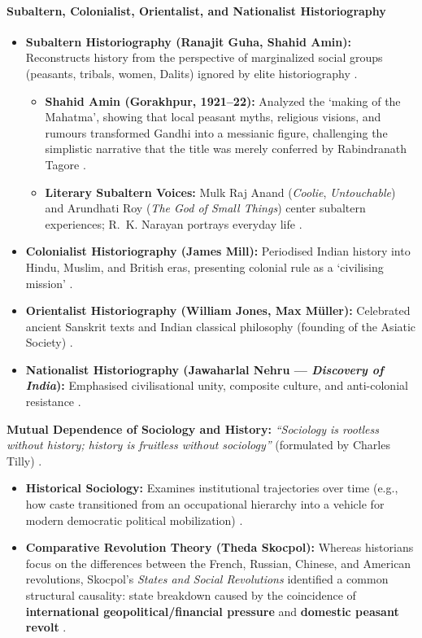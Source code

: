 \paragraph{Subaltern, Colonialist, Orientalist, and Nationalist Historiography}
\begin{KeyConcept}
\begin{itemize}
    \item \textbf{Subaltern Historiography (Ranajit Guha, Shahid Amin):} Reconstructs history from the perspective of marginalized social groups (peasants, tribals, women, Dalits) ignored by elite historiography .
    \begin{itemize}
        \item \textbf{Shahid Amin (Gorakhpur, 1921--22):} Analyzed the `making of the Mahatma', showing that local peasant myths, religious visions, and rumours transformed Gandhi into a messianic figure, challenging the simplistic narrative that the title was merely conferred by Rabindranath Tagore .
        \item \textbf{Literary Subaltern Voices:} Mulk Raj Anand (\textit{Coolie}, \textit{Untouchable}) and Arundhati Roy (\textit{The God of Small Things}) center subaltern experiences; R.~K. Narayan portrays everyday life .
    \end{itemize}
    \item \textbf{Colonialist Historiography (James Mill):} Periodised Indian history into Hindu, Muslim, and British eras, presenting colonial rule as a `civilising mission' .
    \item \textbf{Orientalist Historiography (William Jones, Max Müller):} Celebrated ancient Sanskrit texts and Indian classical philosophy (founding of the Asiatic Society) .
    \item \textbf{Nationalist Historiography (Jawaharlal Nehru --- \textit{Discovery of India}):} Emphasised civilisational unity, composite culture, and anti-colonial resistance .
\end{itemize}
\end{KeyConcept}

\begin{KeyConcept}
\textbf{Mutual Dependence of Sociology and History:}
\textit{``Sociology is rootless without history; history is fruitless without sociology''} (formulated by Charles Tilly) .
\begin{itemize}
    \item \textbf{Historical Sociology:} Examines institutional trajectories over time (e.g., how caste transitioned from an occupational hierarchy into a vehicle for modern democratic political mobilization) .
    \item \textbf{Comparative Revolution Theory (Theda Skocpol):} Whereas historians focus on the differences between the French, Russian, Chinese, and American revolutions, Skocpol's \textit{States and Social Revolutions} identified a common structural causality: state breakdown caused by the coincidence of \textbf{international geopolitical/financial pressure} and \textbf{domestic peasant revolt} .
\end{itemize}
\end{KeyConcept}

